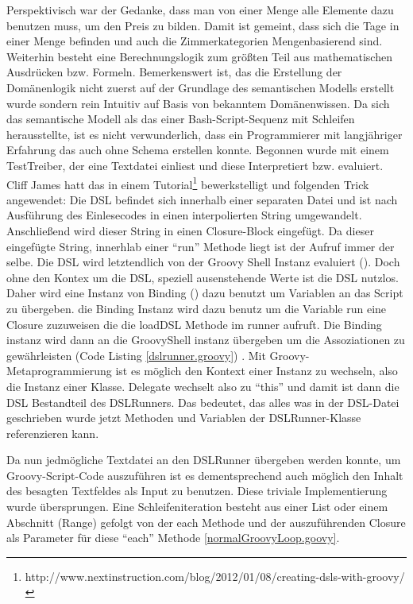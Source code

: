 \documentclass[11pt,english,ngerman, headsepline]{scrreprt}
\begin{document}
Perspektivisch war der Gedanke, dass man von einer Menge alle Elemente dazu
benutzen muss, um den Preis zu bilden. Damit ist gemeint, dass sich die Tage in
einer Menge befinden und auch die Zimmerkategorien Mengenbasierend sind.
Weiterhin besteht eine Berechnungslogik zum größten Teil aus mathematischen
Ausdrücken bzw. Formeln.
Bemerkenswert ist, das die Erstellung der Domänenlogik nicht zuerst auf der
Grundlage des semantischen Modells erstellt wurde sondern rein Intuitiv auf
Basis von bekanntem Domänenwissen. Da sich das semantische Modell als das einer
Bash-Script-Sequenz mit Schleifen herausstellte, ist es nicht verwunderlich,
dass ein Programmierer mit langjähriger Erfahrung das auch ohne Schema erstellen
konnte.
Begonnen wurde mit einem TestTreiber, der eine Textdatei einliest und diese
Interpretiert bzw. evaluiert.
Cliff James hatt das in einem
Tutorial\footnote{http://www.nextinstruction.com/blog/2012/01/08/creating-dsls-with-groovy/}
bewerkstelligt und folgenden Trick angewendet:
Die DSL befindet sich innerhalb einer separaten Datei und ist nach Ausführung
des Einlesecodes in einen interpolierten String umgewandelt. Anschließend wird
dieser String in einen Closure-Block eingefügt.
Da dieser eingefügte String, innerhlab einer ``run'' Methode liegt ist der
Aufruf immer der selbe.
Die DSL wird letztendlich von der Groovy Shell Instanz evaluiert (\cite[S.
368]{koenig2007groovy}). 
Doch ohne den Kontex um die DSL, speziell ausenstehende Werte ist die DSL nutzlos. Daher wird
eine Instanz von Binding (\cite[S. 368]{koenig2007groovy}) dazu benutzt um
Variablen an das Script zu übergeben.
die Binding Instanz wird dazu benutz um die Variable run eine Closure zuzuweisen
die die loadDSL Methode im runner aufruft. Die Binding instanz wird dann an
die GroovyShell instanz übergeben um die Assoziationen zu gewährleisten (Code
Listing \ref{dslrunner.groovy}) .
Mit Groovy-Metaprogrammierung ist es möglich den Kontext einer Instanz zu
wechseln, also die Instanz einer Klasse. Delegate wechselt also zu ``this'' und
damit ist dann die DSL Bestandteil des DSLRunners. Das bedeutet, das alles was
in der DSL-Datei geschrieben wurde jetzt Methoden und Variablen der
DSLRunner-Klasse referenzieren kann.
 


Da nun jedmögliche Textdatei an den DSLRunner übergeben werden konnte, um
Groovy-Script-Code auszuführen ist es dementsprechend auch möglich den Inhalt
des besagten Textfeldes als Input zu benutzen. Diese triviale Implementierung
wurde übersprungen. 
 Eine Schleifeniteration besteht aus einer List oder
einem Abschnitt (Range) gefolgt von der each Methode und der auszuführenden
Closure als Parameter für diese ``each'' Methode \ref{normalGroovyLoop.goovy}.
\end{document}

